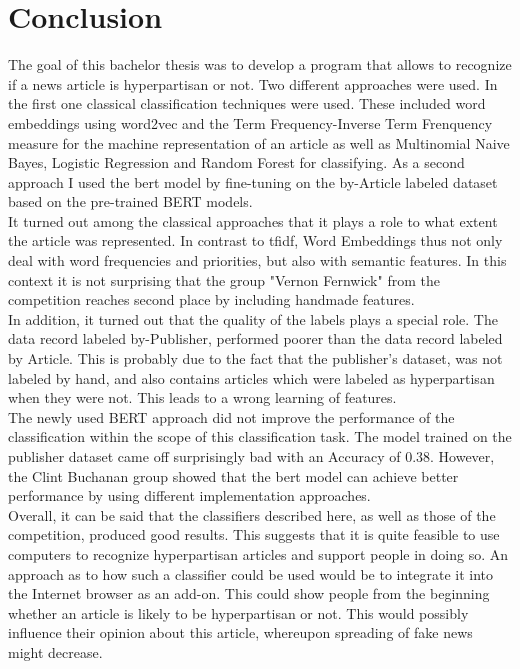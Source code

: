 \documentclass[a4paper, 11pt,titlepage,oneside,openany]{book}
\begin{document}
\chapter{Conclusion}
The goal of this bachelor thesis was to develop a program that allows to recognize if a news article is hyperpartisan or not. Two different approaches were used. In the first one classical classification techniques were used. These included word embeddings using word2vec and the Term Frequency-Inverse Term Frenquency measure for the machine representation of an article as well as Multinomial Naive Bayes, Logistic Regression and Random Forest for classifying. As a second approach I used the \gls{bert} model by fine-tuning on the by-Article labeled dataset based on the pre-trained BERT models. \\
\indent It turned out among the classical approaches that it plays a role to what extent the article was represented. In contrast to \gls{tfidf}, Word Embeddings thus not only deal with word frequencies and priorities, but also with semantic features. In this context it is not surprising that the group "Vernon Fernwick" from the competition reaches second place by including handmade features. \\
\indent In addition, it turned out that the quality of the labels plays a special role. The data record labeled by-Publisher, performed poorer than the data record labeled by Article. This is probably due to the fact that the publisher's dataset, was not labeled by hand, and also contains articles which were labeled as hyperpartisan when they were not. This leads to a wrong learning of features.\\
\indent The newly used BERT approach did not improve the performance of the classification within the scope of this classification task. The model trained on the publisher dataset came off surprisingly bad with an Accuracy of 0.38. However, the Clint Buchanan group showed that the \gls{bert} model can achieve better performance by using different implementation approaches.\\
\indent Overall, it can be said that the classifiers described here, as well as those of the competition, produced good results. This suggests that it is quite feasible to use computers to recognize hyperpartisan articles and support people in doing so.
An approach as to how such a classifier could be used would be to integrate it into the Internet browser as an add-on. This could show people from the beginning whether an article is likely to be hyperpartisan or not. This would possibly influence their opinion about this article, whereupon spreading of fake news might decrease.
\end{document}
